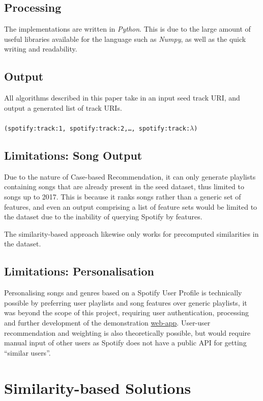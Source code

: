 \documentclass[a4paper, 12pt]{report}
\begin{document}
\section{Processing}
The implementations are written in \emph{Python}.
This is due to the large amount of useful libraries available for the language such as \emph{Numpy}, as well as the quick 
writing and readability. 

\section{Output}
All algorithms described in this paper take in an input seed track URI, and output a generated list of track URIs.
\\
\\
\texttt{(spotify:track:1, spotify:track:2,\ldots, spotify:track:\(\lambda\))}

\section{Limitations: Song Output}\label{section:limsongs}
Due to the nature of Case-based Recommendation, it can only generate playlists containing songs that are already present in the seed dataset, 
thus limited to songs up to 2017.
This is because it ranks songs rather than a generic set of features, and even an output comprising a list of feature sets would be limited to the dataset
due to the inability of querying Spotify by features.

The similarity-based approach likewise only works for precomputed similarities in the dataset.

\section{Limitations: Personalisation}\label{section:limpersonalisation}
Personalising songs and genres based on a Spotify User Profile is technically possible by preferring user playlists and song features
over generic playlists, it was beyond the scope of this project, requiring user authentication, processing and further development of the demonstration \hyperref[chap:webapp]{web-app}.
User-user recommendation and weighting is also theoretically possible, but would require manual input of other users as Spotify does not have a
public API for getting ``similar users''.



\chapter{Similarity-based Solutions}
\end{document}
